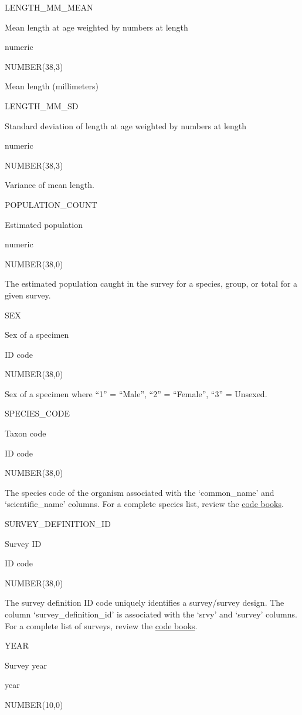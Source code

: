 \documentclass[
  letterpaper,
  oneside,
  open=any]{scrbook}
\begin{document}
LENGTH\_MM\_MEAN

Mean length at age weighted by numbers at length

numeric

NUMBER(38,3)

Mean length (millimeters)

LENGTH\_MM\_SD

Standard deviation of length at age weighted by numbers at length

numeric

NUMBER(38,3)

Variance of mean length.

POPULATION\_COUNT

Estimated population

numeric

NUMBER(38,0)

The estimated population caught in the survey for a species, group, or
total for a given survey.

SEX

Sex of a specimen

ID code

NUMBER(38,0)

Sex of a specimen where ``1'' = ``Male'', ``2'' = ``Female'', ``3'' =
Unsexed.

SPECIES\_CODE

Taxon code

ID code

NUMBER(38,0)

The species code of the organism associated with the `common\_name' and
`scientific\_name' columns. For a complete species list, review the
\href{https://www.fisheries.noaa.gov/resource/document/groundfish-survey-species-code-manual-and-data-codes-manual}{code
books}.

SURVEY\_DEFINITION\_ID

Survey ID

ID code

NUMBER(38,0)

The survey definition ID code uniquely identifies a survey/survey
design. The column `survey\_definition\_id' is associated with the
`srvy' and `survey' columns. For a complete list of surveys, review the
\href{https://www.fisheries.noaa.gov/resource/document/groundfish-survey-species-code-manual-and-data-codes-manual}{code
books}.

YEAR

Survey year

year

NUMBER(10,0)
\end{document}
